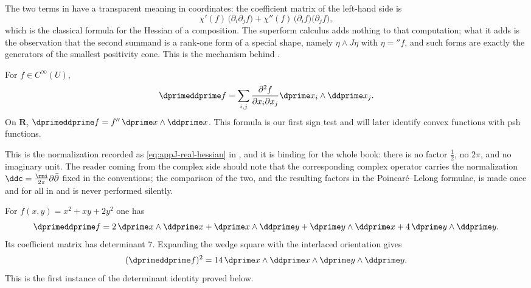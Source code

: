 The two terms in  have a transparent meaning
in coordinates: the coefficient matrix of the left-hand side is
\[
 \chi'(f)\,\bigl(\partial_i\partial_jf\bigr)
 +\chi''(f)\,\bigl(\partial_if\bigr)\bigl(\partial_jf\bigr),
\]
which is the classical formula for the Hessian of a composition.  The
superform calculus adds nothing to that computation; what it adds is the
observation that the second summand is a rank-one form of a special shape,
namely $\eta\wedge J\eta$ with $\eta=\dprime f$, and such forms are exactly
the generators of the smallest positivity cone.  This is the mechanism behind
.

\begin{example}
\label{ex:ch09-hessian-form}
For $f\in C^\infty(U)$,
\[
\dprimeddprime f=\sum_{i,j}\frac{\partial^2f}{\partial x_i\partial x_j}
                      \dprime x_i\wedge \ddprime x_j.
\]
On $\mathbf R$, $\dprimeddprime f=f''\,\dprime x\wedge \ddprime x$. This formula is our first sign
test and will later identify convex functions with psh functions.
\end{example}

This is the normalization recorded as \eqref{eq:appJ-real-hessian} in
, and it is binding for the whole book: there is no factor
$\tfrac12$, no $2\pi$, and no imaginary unit.  The reader coming from the
complex side should note that the corresponding complex operator carries the
normalization $\ddc=\tfrac{\rmi}{2\pi}\partial\bar\partial$ fixed in the
conventions; the comparison of the two, and the resulting factors in the
Poincar\'e--Lelong formulae, is made once and for all in
 and is never performed silently.

\begin{example}
\label{ex:ch09-two-variable-sign}
For $f(x,y)=x^2+xy+2y^2$ one has
\[
 \dprimeddprime f
 =2\,\dprime x\wedge\ddprime x
  +\dprime x\wedge\ddprime y
  +\dprime y\wedge\ddprime x
  +4\,\dprime y\wedge\ddprime y.
\]
Its coefficient matrix has determinant $7$.  Expanding the wedge square with
the interlaced orientation gives
\[
 (\dprimeddprime f)^2
 =14\,\dprime x\wedge\ddprime x\wedge
       \dprime y\wedge\ddprime y.
\]
This is the first instance of the determinant identity proved below.
\end{example}

